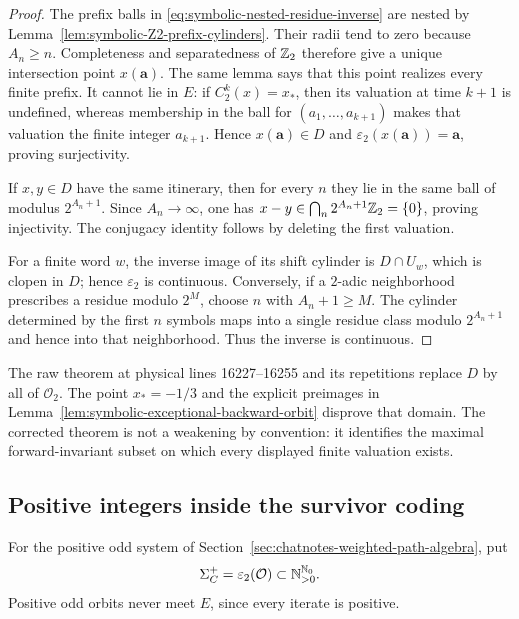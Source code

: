 \begin{proof}
The prefix balls in \eqref{eq:symbolic-nested-residue-inverse} are nested
by Lemma~\ref{lem:symbolic-Z2-prefix-cylinders}.  Their radii tend to zero
because $A_n\geq n$.  Completeness and separatedness of $\mathbb{Z}_{2}$ therefore
give a unique intersection point $x(\mathbf a)$.  The same lemma says that
this point realizes every finite prefix.  It cannot lie in $E$: if
$C_2^k(x)=x_*$, then its valuation at time $k+1$ is undefined, whereas
membership in the ball for $(a_1,\ldots,a_{k+1})$ makes that valuation the
finite integer $a_{k+1}$.  Hence $x(\mathbf a)\in D$ and
$\varepsilon_2(x(\mathbf a))=\mathbf a$, proving surjectivity.

If $x,y\in D$ have the same itinerary, then for every $n$ they lie in the
same ball of modulus $2^{A_n+1}$.  Since $A_n\to\infty$, one has
$x-y\in\bigcap_n2^{A_n+1}\mathbb{Z}_{2}=\{0\}$, proving injectivity.  The conjugacy
identity follows by deleting the first valuation.

For a finite word $w$, the inverse image of its shift cylinder is
$D\cap U_w$, which is clopen in $D$; hence $\varepsilon_2$ is continuous.
Conversely, if a $2$-adic neighborhood prescribes a residue modulo $2^M$,
choose $n$ with $A_n+1\geq M$.  The cylinder determined by the first $n$
symbols maps into a single residue class modulo $2^{A_n+1}$ and hence into
that neighborhood.  Thus the inverse is continuous.
\end{proof}

\begin{sourceissue}
\label{sourceissue:symbolic-all-odd-Z2-domain}
The raw theorem at physical lines 16227--16255 and its repetitions replace
$D$ by all of $\mathcal O_2$.  The point $x_*=-1/3$ and the explicit
preimages in Lemma~\ref{lem:symbolic-exceptional-backward-orbit} disprove
that domain.  The corrected theorem is not a weakening by convention: it
identifies the maximal forward-invariant subset on which every displayed
finite valuation exists.
\end{sourceissue}

\subsection{Positive integers inside the survivor coding}

For the positive odd system of Section~\ref{sec:chatnotes-weighted-path-algebra},
put
\[
 \Sigma_C^+=\varepsilon_2(\mathcal O)\subset\mathbb{N}_{>0}^{\mathbb{N}_{0}}.
\]
Positive odd orbits never meet $E$, since every iterate is positive.

